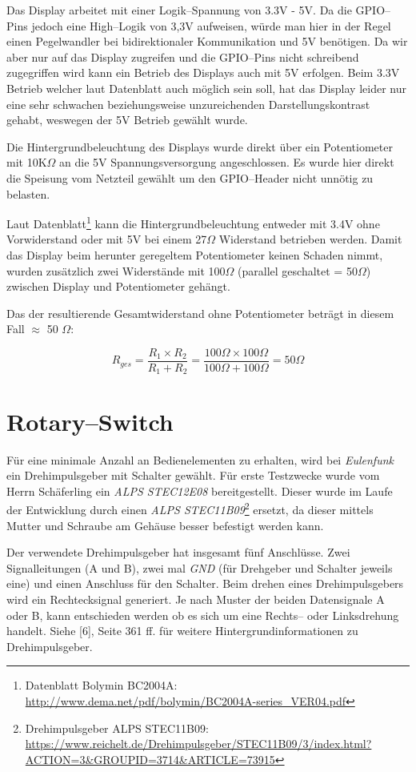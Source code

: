 \documentclass[11pt,ngerman,toc=listof,index=totoc]{scrreprt}
\begin{document}
Das Display arbeitet mit einer Logik--Spannung von 3.3V - 5V. Da die
GPIO--Pins jedoch eine High--Logik von 3,3V aufweisen, würde man hier in
der Regel einen Pegelwandler bei bidirektionaler Kommunikation und 5V
benötigen. Da wir aber nur auf das Display zugreifen und die GPIO--Pins
nicht schreibend zugegriffen wird kann ein Betrieb des Displays auch mit
5V erfolgen. Beim 3.3V Betrieb welcher laut Datenblatt auch möglich sein
soll, hat das Display leider nur eine sehr schwachen beziehungsweise
unzureichenden Darstellungskontrast gehabt, weswegen der 5V Betrieb
gewählt wurde.

Die Hintergrundbeleuchtung des Displays wurde direkt über ein
Potentiometer mit 10K\(\Omega\) an die 5V Spannungsversorgung
angeschlossen. Es wurde hier direkt die Speisung vom Netzteil gewählt um
den GPIO--Header nicht unnötig zu belasten.

Laut Datenblatt\footnote{Datenblatt Bolymin BC2004A:
  \url{http://www.dema.net/pdf/bolymin/BC2004A-series_VER04.pdf}} kann
die Hintergrundbeleuchtung entweder mit 3.4V ohne Vorwiderstand oder mit
5V bei einem 27\(\Omega\) Widerstand betrieben werden. Damit das Display
beim herunter geregeltem Potentiometer keinen Schaden nimmt, wurden
zusätzlich zwei Widerstände mit 100\(\Omega\) (parallel geschaltet =
50\(\Omega\)) zwischen Display und Potentiometer gehängt.

Das der resultierende Gesamtwiderstand ohne Potentiometer beträgt in
diesem Fall \(\approx\) 50 \(\Omega\):

\[  R_{ges} = \frac{R_1 \times R_2}{R_1 + R_2} = \frac{100\Omega \times 100\Omega}{100\Omega + 100\Omega} = 50\Omega \]

\section{Rotary--Switch}\label{rotaryswitch}

Für eine minimale Anzahl an Bedienelementen zu erhalten, wird bei
\emph{Eulenfunk} ein Drehimpulsgeber mit Schalter gewählt. Für erste
Testzwecke wurde vom Herrn Schäferling ein \emph{ALPS STEC12E08}
bereitgestellt. Dieser wurde im Laufe der Entwicklung durch einen
\emph{ALPS STEC11B09}\footnote{Drehimpulsgeber ALPS STEC11B09:
  \url{https://www.reichelt.de/Drehimpulsgeber/STEC11B09/3/index.html?ACTION=3&GROUPID=3714&ARTICLE=73915}}
ersetzt, da dieser mittels Mutter und Schraube am Gehäuse besser
befestigt werden kann.

Der verwendete Drehimpulsgeber hat insgesamt fünf Anschlüsse. Zwei
Signalleitungen (A und B), zwei mal \emph{GND} (für Drehgeber und
Schalter jeweils eine) und einen Anschluss für den Schalter. Beim drehen
eines Drehimpulsgebers wird ein Rechtecksignal generiert. Je nach Muster
der beiden Datensignale A oder B, kann entschieden werden ob es sich um
eine Rechts-- oder Linksdrehung handelt. Siehe {[}6{]}, Seite 361 ff.
für weitere Hintergrundinformationen zu Drehimpulsgeber.
\end{document}

